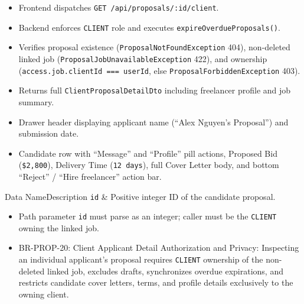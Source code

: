\begin{itemize}[leftmargin=1.6em,topsep=3pt,itemsep=2pt,parsep=0pt,label=$\bullet$]
    \item Frontend dispatches \texttt{GET /api/proposals/:id/client}.
    \item Backend enforces \texttt{CLIENT} role and executes \texttt{expireOverdueProposals()}.
    \item Verifies proposal existence (\texttt{ProposalNotFoundException} 404), non-deleted linked job (\texttt{ProposalJobUnavailableException} 422), and ownership (\texttt{access.job.clientId === userId}, else \texttt{ProposalForbiddenException} 403).
    \item Returns full \texttt{ClientProposalDetailDto} including freelancer profile and job summary.
\end{itemize}

\begin{itemize}[leftmargin=1.6em,topsep=3pt,itemsep=2pt,parsep=0pt,label=$\bullet$]
    \item Drawer header displaying applicant name (``Alex Nguyen's Proposal'') and submission date.
    \item Candidate row with ``Message'' and ``Profile'' pill actions, Proposed Bid (\texttt{\$2,800}), Delivery Time (\texttt{12 days}), full Cover Letter body, and bottom ``Reject'' / ``Hire freelancer'' action bar.
\end{itemize}


\begin{specdatatable}{Data Name}{Description}
\texttt{id} & Positive integer ID of the candidate proposal.\\ \hline
\end{specdatatable}

\begin{itemize}[leftmargin=1.6em,topsep=3pt,itemsep=2pt,parsep=0pt,label=$\bullet$]
    \item Path parameter \texttt{id} must parse as an integer; caller must be the \texttt{CLIENT} owning the linked job.
\end{itemize}

\begin{itemize}[leftmargin=1.6em,topsep=3pt,itemsep=2pt,parsep=0pt,label=$\bullet$]\brrulelist
    \item BR-PROP-20: Client Applicant Detail Authorization and Privacy: Inspecting an individual applicant's proposal requires \texttt{CLIENT} ownership of the non-deleted linked job, excludes drafts, synchronizes overdue expirations, and restricts candidate cover letters, terms, and profile details exclusively to the owning client.
\end{itemize}

